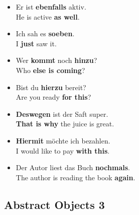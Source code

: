 \begin{itemize}
  \item  Er ist \textbf{ebenfalls} aktiv. \\
  He is active \textbf{as well}.
  \item  Ich sah es \textbf{soeben}. \\
  I \textbf{just} saw it.
  \item  Wer \textbf{kommt} noch \textbf{hinzu}? \\
  Who \textbf{else is coming}?
  \item  Bist du \textbf{hierzu} bereit? \\
  Are you ready \textbf{for this}?
  \item  \textbf{Deswegen} ist der Saft super. \\
  \textbf{That is why} the juice is great.
  \item  \textbf{Hiermit} m{\"o}chte ich bezahlen. \\
  I would like to pay \textbf{with this}.
  \item  Der Autor liest das Buch \textbf{nochmals}. \\
  The author is reading the book \textbf{again}.
\end{itemize}


\pagebreak
\subsection{Abstract Objects 3}

